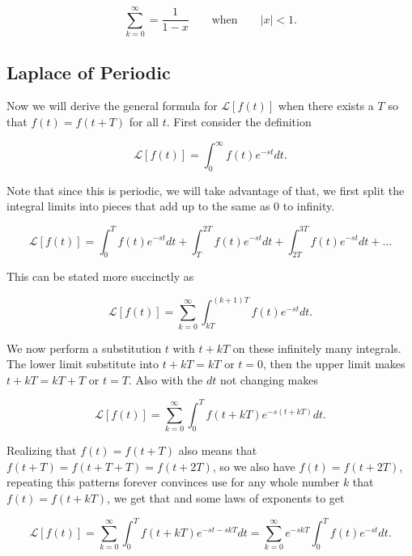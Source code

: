 \documentclass[12pt]{article}
\newcommand{\lp}{\mathscr{L}}
\begin{document}
\begin{equation*} 
  \sum_{k=0}^{\infty} = \frac{1}{1-x} \qquad \text{when} \qquad |x|<1.
\end{equation*}

\subsection{Laplace of Periodic}

Now we will derive the general formula for $\lp[f(t)]$ when there exists a $T$ so that $f(t)=f(t+T)$ for all $t$. First consider the definition

\begin{equation*}
    \lp[f(t)]=\int_0^{\infty} f(t) e^{-st} dt.
\end{equation*}

Note that since this is periodic, we will take advantage of that, we first split the integral limits into pieces that add up to the same as 0 to infinity.

\begin{equation*}
    \lp[f(t)]=\int_0^{T} f(t) e^{-st} dt+\int_{T}^{2T} f(t) e^{-st} dt+\int_{2T}^{3T} f(t) e^{-st} dt+\ldots
\end{equation*}

This can be stated more succinctly as

\begin{equation*}
    \lp[f(t)]=\sum_{k=0}^\infty \int_{kT}^{(k+1)T} f(t) e^{-st} dt.
\end{equation*}

We now perform a substitution $t$ with $t+kT$ on these infinitely many integrals. The lower limit substitute into $t+kT=kT$ or $t=0$, then the upper limit makes $t+kT=kT+T$ or $t=T$. Also with the $dt$ not changing makes

\begin{equation*}
    \lp[f(t)]=\sum_{k=0}^\infty \int_{0}^{T} f(t+kT) e^{-s(t+kT)} dt.
\end{equation*}

Realizing that $f(t)=f(t+T)$ also means that $f(t+T)=f(t+T+T)=f(t+2T)$, so we also have $f(t)=f(t+2T)$, repeating this patterns forever convinces use for any whole number $k$ that $f(t)=f(t+kT)$, we get that and some laws of exponents to get

\begin{equation*}
    \lp[f(t)]=\sum_{k=0}^\infty \int_{0}^{T} f(t+kT) e^{-st-skT} dt=\sum_{k=0}^\infty e^{-skT} \int_{0}^{T} f(t) e^{-st} dt.
\end{equation*}
\end{document}
